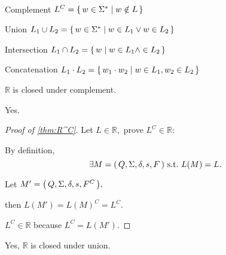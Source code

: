 \begin{definition} \ \\
    \begin{compactdesc}
    \item[Complement]
        $L^C = { \left\{\,w \in \Sigma^* \mid w \notin L\,\right\} }$
    \item[Union]
        $L_1 \cup L_2 = { \left\{\,w \in \Sigma^* \mid w \in L_1 \vee w \in L_2\,\right\} }$
    \item[Intersection]
        $L_1 \cap L_2 = { \left\{\,w \mid w \in L_1 \wedge \in L_2\,\right\} }$
    \item[Concatenation]
        $L_1 \cdot L_2 = { \left\{\,w_1 \cdot w_2 \mid w \in L_1, w_2 \in L_2\,\right\} }$
    \end{compactdesc}
\end{definition}

\begin{theorem}
    \label{thm:R^C}
    $\mathbb R$ is closed under complement.
\end{theorem}

\begin{example}
    Yes.

    \begin{proof}[Proof of \autoref{thm:R^C}]
        Let $L \in \mathbb R,$
        prove $L^C \in \mathbb R:$

        By definition, 
        \[
            \exists \DFA \text{ s.t.\ } L(M) = L.
        \]

        Let $M' = { \left(\,Q,\Sigma,\delta,s,F^C\,\right) },$

        then $L(M') = L(M)^C = L^C.$

        $L^C \in \mathbb R$ because $L^C = L(M').$
    \end{proof}
\end{example}

\begin{example}
        Yes, $\mathbb R$ is closed under union.
\end{example}

